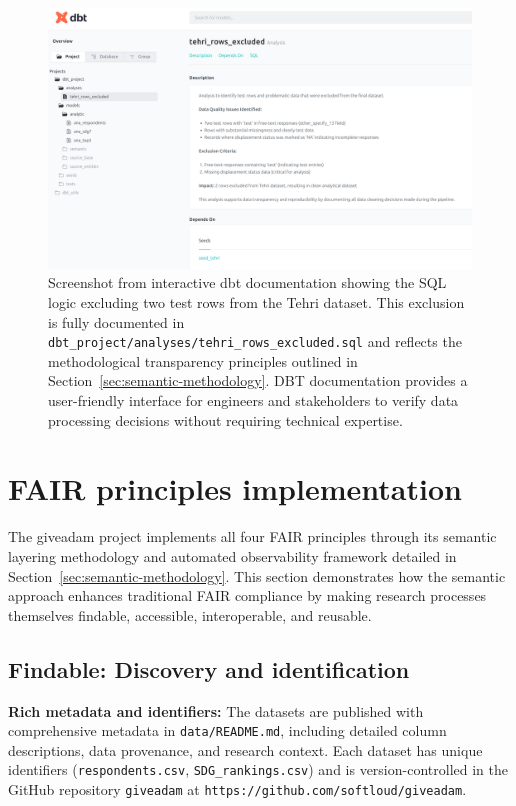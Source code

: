 \documentclass{article}
\begin{document}
\begin{figure}[ht]
  \centering
  \includegraphics[width=\textwidth]{img/dbt-docs-tehri-exclusions.png}
  \caption{\label{fig:tehri-exclusions} Screenshot from interactive dbt documentation showing the SQL logic excluding two test rows from the Tehri dataset. This exclusion is fully documented in \texttt{dbt\_project/analyses/tehri\_rows\_excluded.sql} and reflects the methodological transparency principles outlined in Section~\ref{sec:semantic-methodology}. DBT documentation provides a user-friendly interface for engineers and stakeholders to verify data processing decisions without requiring technical expertise.}
\end{figure}

\section{FAIR principles implementation}
\label{sec:fair}

The giveadam project implements all four FAIR principles \cite{wilkinson2016fair} through its semantic layering methodology and automated observability framework detailed in Section~\ref{sec:semantic-methodology}. This section demonstrates how the semantic approach enhances traditional FAIR compliance by making research processes themselves findable, accessible, interoperable, and reusable.

\subsection{Findable: Discovery and identification}

\textbf{Rich metadata and identifiers:} The datasets are published with comprehensive metadata in \texttt{data/README.md}, including detailed column descriptions, data provenance, and research context. Each dataset has unique identifiers (\texttt{respondents.csv}, \texttt{SDG\_rankings.csv}) and is version-controlled in the GitHub repository \texttt{giveadam} at \texttt{https://github.com/softloud/giveadam}.
\end{document}
